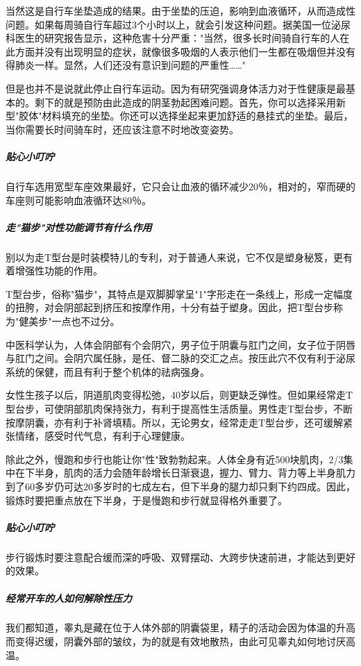 \begin{enumerate}
当然这是自行车坐垫造成的结果。由于坐垫的压迫，影响到血液循环，从而造成性问题。如果每周骑自行车超过3个小时以上，就会引发这种问题。据美国一位泌尿科医生的研究报告显示，这种危害十分严重："当然，很多长时间骑自行车的人在此方面并没有出现明显的症状，就像很多吸烟的人表示他们一生都在吸烟但并没有得肺炎一样。显然，人们还没有意识到问题的严重性……"

但是也并不是说就此停止自行车运动。因为有研究强调身体活力对于性健康是最基本的。剩下的就是预防由此造成的阴茎勃起困难问题。首先，你可以选择采用新型"胶体"材料填充的坐垫。你还可以选择坐起来更加舒适的悬挂式的坐垫。最后，当你需要长时间骑车时，还应该注意不时地改变姿势。

\subparagraph{贴心小叮咛}

自行车选用宽型车座效果最好，它只会让血液的循环减少20％，相对的，窄而硬的车座则可能影响血液循环达80％。

\subparagraph{走"猫步"对性功能调节有什么作用}

别以为走T型台是时装模特儿的专利，对于普通人来说，它不仅是塑身秘笈，更有着增强性功能的作用。

T型台步，俗称"猫步"，其特点是双脚脚掌呈"1"字形走在一条线上，形成一定幅度的扭胯，对会阴部起到挤压和按摩作用，十分有益于塑身。因此，把T型台步称为"健美步"一点也不过分。

中医科学认为，人体会阴部有个会阴穴，男子位于阴囊与肛门之间，女子位于阴唇与肛门之间。会阴穴属任脉，是任、督二脉的交汇之点。按压此穴不仅有利于泌尿系统的保健，而且有利于整个机体的祛病强身。

女性生孩子以后，阴道肌肉变得松弛，40岁以后，则更缺乏弹性。但如果经常走T型台步，可使阴部肌肉保持张力，有利于提高性生活质量。男性走T型台步，不断按摩阴囊，亦有利于补肾填精。所以，无论男女，经常走走T型台步，还可缓解紧张情绪，感受时代气息，有利于心理健康。

除此之外，慢跑和步行也能让你"性"致勃勃起来。人体全身有近500块肌肉，2/3集中在下半身，肌肉的活力会随年龄增长日渐衰退，握力、臂力、背力等上半身肌力到了60多岁仍可达20多岁时的七成左右，但下半身的腿力却只剩下约四成。因此，锻炼时要把重点放在下半身，于是慢跑和步行就显得格外重要了。

\subparagraph{贴心小叮咛}

步行锻炼时要注意配合缓而深的呼吸、双臂摆动、大跨步快速前进，才能达到更好的效果。

\subparagraph{经常开车的人如何解除性压力}

我们都知道，睾丸是藏在位于人体外部的阴囊袋里，精子的活动会因为体温的升高而变得迟缓，阴囊外部的皱纹，为的就是有效地散热，由此可见睾丸如何地讨厌高温。


\end{enumerate}

